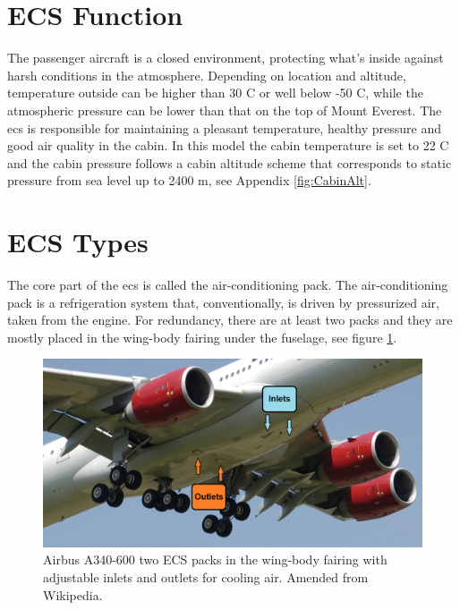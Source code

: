 \documentclass[english]{kththesis}
\begin{document}
\section{ECS Function}
\label{sec:ECSfunction}

The passenger aircraft is a closed environment, protecting what's inside against harsh conditions in the atmosphere. Depending on location and altitude, temperature outside can be higher than 30 \degree C or well below -50 \degree C, while the atmospheric pressure can be lower than that on the top of Mount Everest. The \acrshort{ecs} is responsible for maintaining a pleasant temperature, healthy pressure and good air quality in the cabin. In this model the cabin temperature is set to 22 \degree C and the cabin pressure follows a cabin altitude scheme that corresponds to static pressure from sea level up to 2400 m, see Appendix \ref{fig:CabinAlt}.%

\section{ECS Types}
\label{sec:ECStypes}

The core part of the \acrshort{ecs} is called the air-conditioning pack. The air-conditioning pack is a refrigeration system that, conventionally, is driven by pressurized air, taken from the engine. For redundancy, there are at least two packs and they are mostly placed in the wing-body fairing under the fuselage, see figure \ref{fig:A340ECS}.

\begin{figure}[!ht]
    \centering
    \includegraphics[width=1\textwidth]{Epictures/ECS_Packs_A340-600_Inlet_Outlet.png}
    \caption{Airbus A340-600 two ECS packs in the wing-body fairing with adjustable inlets and outlets for cooling air. Amended from Wikipedia.}
    \label{fig:A340ECS}
\end{figure}
\end{document}
